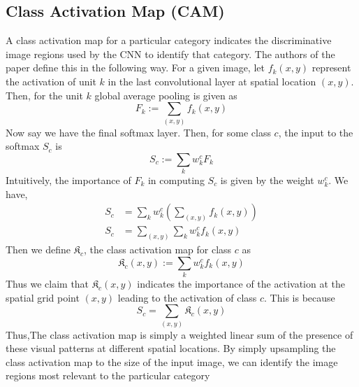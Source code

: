 \subsection{Class Activation Map (CAM)}
A class activation map for a particular category indicates the discriminative image regions used by the CNN to identify that category. The authors of the paper \cite{CAM} define this in the following way. For a given image, let $f_k(x,y)$ represent the activation of unit $k$ in the last convolutional layer at spatial location $(x,y)$. Then, for the unit $k$ global average pooling is given as \[F_k := \sum_{(x,y)}f_k(x,y)\]
Now say we have the final softmax layer. Then, for some class $c$, the input to the softmax $S_c$ is 
\[S_c := \sum_k w_k^cF_k\]
Intuitively, the importance of $F_k$ in computing $S_c$ is given by the weight $w_k^c$. We have,
\begin{align}
S_c &= \sum_kw_k^c\left(\sum_{(x,y)}f_k(x,y)\right) \\ 
S_c &= \sum_{(x,y)}\sum_kw_k^cf_k(x,y) 
\end{align}
Then we define $\mathfrak{K}_c$, the class activation map for class $c$ as
\[\mathfrak{K}_c(x,y) := \sum_kw_k^cf_k(x,y)\]
Thus we claim that $\mathfrak{K}_c(x,y)$ indicates the importance of the activation at the spatial grid point $(x,y)$ leading to the activation of class $c$. This is because
\[S_c = \sum_{(x,y)}\mathfrak{K}_c(x,y)\]
Thus,The class activation map is simply a weighted linear sum of the presence of these visual patterns at different spatial locations. By simply upsampling the class activation map to the size of the input image, we can identify the image regions most relevant to the particular category

